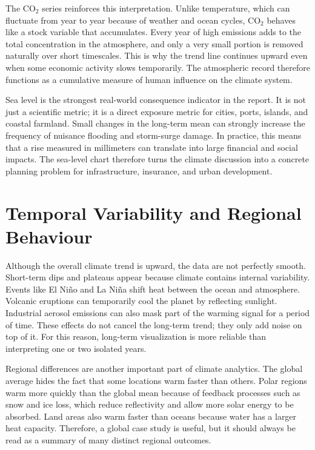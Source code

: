 \documentclass[conference]{IEEEtran}
\begin{document}
The CO$_2$ series reinforces this interpretation. Unlike temperature, which can fluctuate from year to year because of weather and ocean cycles, CO$_2$ behaves like a stock variable that accumulates. Every year of high emissions adds to the total concentration in the atmosphere, and only a very small portion is removed naturally over short timescales. This is why the trend line continues upward even when some economic activity slows temporarily. The atmospheric record therefore functions as a cumulative measure of human influence on the climate system.

Sea level is the strongest real-world consequence indicator in the report. It is not just a scientific metric; it is a direct exposure metric for cities, ports, islands, and coastal farmland. Small changes in the long-term mean can strongly increase the frequency of nuisance flooding and storm-surge damage. In practice, this means that a rise measured in millimeters can translate into large financial and social impacts. The sea-level chart therefore turns the climate discussion into a concrete planning problem for infrastructure, insurance, and urban development.

\section{Temporal Variability and Regional Behaviour}
Although the overall climate trend is upward, the data are not perfectly smooth. Short-term dips and plateaus appear because climate contains internal variability. Events like El Niño and La Niña shift heat between the ocean and atmosphere. Volcanic eruptions can temporarily cool the planet by reflecting sunlight. Industrial aerosol emissions can also mask part of the warming signal for a period of time. These effects do not cancel the long-term trend; they only add noise on top of it. For this reason, long-term visualization is more reliable than interpreting one or two isolated years.

Regional differences are another important part of climate analytics. The global average hides the fact that some locations warm faster than others. Polar regions warm more quickly than the global mean because of feedback processes such as snow and ice loss, which reduce reflectivity and allow more solar energy to be absorbed. Land areas also warm faster than oceans because water has a larger heat capacity. Therefore, a global case study is useful, but it should always be read as a summary of many distinct regional outcomes.
\end{document}
